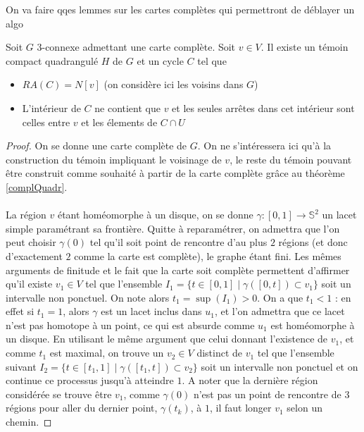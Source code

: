 \documentclass{scrartcl}
\begin{document}
\begin{flushleft}
On va faire qqes lemmes sur les cartes complètes qui permettront de déblayer un algo

\begin{prop}\label{cyclSep}
    Soit $G$ $3$-connexe admettant une carte complète. Soit $v \in V$. Il existe un témoin compact quadrangulé $H$ de $G$ et
    un cycle $C$ tel que
    \begin{itemize}
        \item $RA(C) = N[v]$ (on considère ici les voisins dans $G$)
        \item L'intérieur de $C$ ne contient que $v$ et les seules arrêtes dans cet intérieur sont celles entre $v$ et
        les élements de $C \cap U$
    \end{itemize}
\end{prop}

\begin{proof}
    On se donne une carte complète de $G$. On ne s'intéressera ici qu'à la construction du témoin impliquant le voisinage de $v$,
    le reste du témoin pouvant être construit comme souhaité à partir de la carte complète grâce au théorème \ref{complQuadr}.
    \\~\\
    La région $v$ étant homéomorphe à un disque, on se donne
    $\gamma : [0, 1] \rightarrow \mathbb{S}^2$ un lacet simple paramétrant sa frontière. Quitte à reparamétrer, on admettra
    que l'on peut choisir $\gamma(0)$ tel qu'il soit point de rencontre d'au plus $2$ régions
    (et donc d'exactement $2$ comme la carte est complète), le graphe étant fini. Les mêmes arguments de finitude et
    le fait que la carte soit complète permettent d'affirmer qu'il existe $v_1 \in V$ tel que l'ensemble
    $I_1 = \{ t \in [0, 1] \mid \gamma([0, t]) \subset v_1 \}$ soit un intervalle non ponctuel. On note alors $t_1 = \sup(I_1) > 0$.
    On a que $t_1 < 1$ : en effet si $t_1 = 1$, alors $\gamma$ est un lacet inclus dans $u_1$, et l'on admettra que ce lacet
    n'est pas homotope à un point, ce qui est absurde comme $u_1$ est homéomorphe à un disque. En utilisant le même argument que
    celui donnant l'existence de $v_1$, et comme $t_1$ est maximal, on trouve un $v_2 \in V$ distinct de $v_1$ tel que l'ensemble
    suivant $I_2 = \{ t \in [t_1, 1] \mid \gamma([t_1, t]) \subset v_2\}$ soit un intervalle non ponctuel et on continue ce
    processus jusqu'à atteindre $1$. A noter que la dernière région considérée se trouve être $v_1$, comme $\gamma(0)$ n'est pas un
    point de rencontre de $3$ régions pour aller du dernier point, $\gamma(t_k)$, à $1$, il faut longer $v_1$ selon un chemin.

\end{proof}
\end{flushleft}
\end{document}
